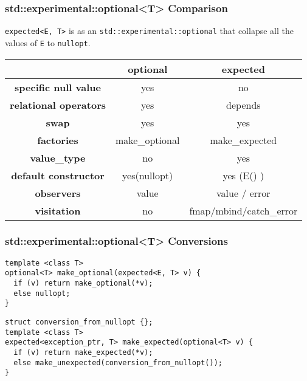\documentclass[xcolor=dvipsnames]{beamer}
\newcommand{\cpp}[1]{\lstinline{#1}}
\begin{document}
\begin{frame}[fragile]
\frametitle{std::experimental::optional<T> Comparison}

\cpp{expected<E, T>} is as an \cpp{std::experimental::optional} that collapse all the values of \cpp{E} to \cpp{nullopt}.

\begin{tabular}{|c|c|c|}
\hline
                    & \textbf{optional} & \textbf{expected}  \\
\hline
\textbf{specific null value} & yes & no \\
\hline
\textbf{relational operators} & yes & depends \\
\hline
\textbf{swap} & yes & yes \\
\hline
\textbf{factories} & make\_optional & make\_expected  \\
\hline
\textbf{value\_type} & no & yes  \\
\hline
\textbf{default constructor} & yes(nullopt)  & yes (E() )  \\
\hline
\textbf{observers} & value  & value / error   \\
\hline
\textbf{visitation} & no & fmap/mbind/catch\_error  \\
\hline
\end{tabular}
\end{frame}

\begin{frame}[fragile]
\frametitle{std::experimental::optional<T> Conversions}
\begin{lstlisting}
template <class T>
optional<T> make_optional(expected<E, T> v) {
  if (v) return make_optional(*v);
  else nullopt;
}
\end{lstlisting}

\begin{lstlisting}
struct conversion_from_nullopt {};
template <class T>
expected<exception_ptr, T> make_expected(optional<T> v) {
  if (v) return make_expected(*v);
  else make_unexpected(conversion_from_nullopt());
}
\end{lstlisting}
\end{frame}
\end{document}
